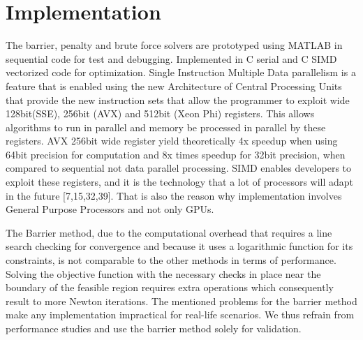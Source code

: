 \documentclass[times,12pt]{ACME2015article}
\begin{document}
\section{Implementation}
The barrier, penalty and brute force solvers are prototyped using MATLAB in sequential code for test and debugging. Implemented in C serial and C SIMD vectorized code for optimization. Single Instruction Multiple Data parallelism is a feature that is enabled using the new Architecture of Central Processing Units that provide the new instruction sets that allow the programmer to exploit wide 128bit(SSE), 256bit (AVX) and 512bit (Xeon Phi) registers. This allows algorithms to run in parallel and memory be processed in parallel by these registers. AVX 256bit wide register yield theoretically 4x speedup when using 64bit precision for computation and 8x times speedup for 32bit precision, when compared to sequential not data parallel processing. SIMD enables developers to exploit these registers, and it is the technology that a lot of processors will adapt in the future [7,15,32,39]. That is also the reason why implementation involves General Purpose Processors and not only GPUs.

The Barrier method, due to the computational overhead that requires a line search checking for convergence and because it uses a logarithmic function for its constraints, is not comparable to the other methods in terms of performance. Solving the objective function with the necessary checks in place near the boundary of the feasible region requires extra operations which consequently result to more Newton iterations. The mentioned problems for the barrier method make any implementation impractical for real-life scenarios. We thus refrain from performance studies and use the barrier method solely for validation.

\clearpage
\end{document}
